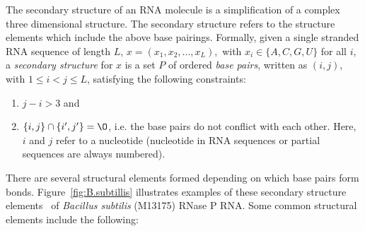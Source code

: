 \documentclass{doublecol-new}
\theoremstyle{TH}{
\newtheorem{lemma}{Lemma}
\newtheorem{theorem}[lemma]{Theorem}
\newtheorem{corrolary}[lemma]{Corrolary}
\newtheorem{conjecture}[lemma]{Conjecture}
\newtheorem{proposition}[lemma]{Proposition}
\newtheorem{claim}[lemma]{Claim}
\newtheorem{stheorem}[lemma]{Wrong Theorem}
\newtheorem{algorithm}{Algorithm}
}
\theoremstyle{THrm}{
\newtheorem{definition}{Definition}
\newtheorem{question}{Question}
\newtheorem{remark}{Remark}
\newtheorem{scheme}{Scheme}
}
\theoremstyle{THhit}{
\newtheorem{case}{Case}[section]
}
\begin{document}
The secondary structure of an RNA molecule is a simplification of a complex three dimensional
structure.  The secondary structure refers to the structure elements which include
the above base pairings.
Formally, given a single stranded RNA sequence of length $L$,
$   x = (x_1, x_2,...,x_L),$
with $x_i \in  \{A,C,G,U\}$ for all $i$,
a {\em secondary structure} for $x$ is a set $P$ of ordered {\em base pairs},
written as $(i,j)$, with $1 \le i <  j \le L$, satisfying the following constraints:
\begin{enumerate}
  \item $j-i > 3$ and
  \item $\{i,j\} \cap \{i',j'\} = \O $, i.e. the base pairs do not conflict with each other. %
 Here, $i$ and $j$ refer to a nucleotide (nucleotide in RNA sequences or partial sequences are always numbered). 
\end{enumerate}
There are several structural elements formed depending on which
base pairs form bonds.
Figure~\ref{fig:B.subtillis} illustrates examples of these secondary structure elements~\cite{brown_1997}
of \textit{Bacillus subtilis} (M13175) RNase P RNA.
Some common structural elements include the following:
\end{document}
